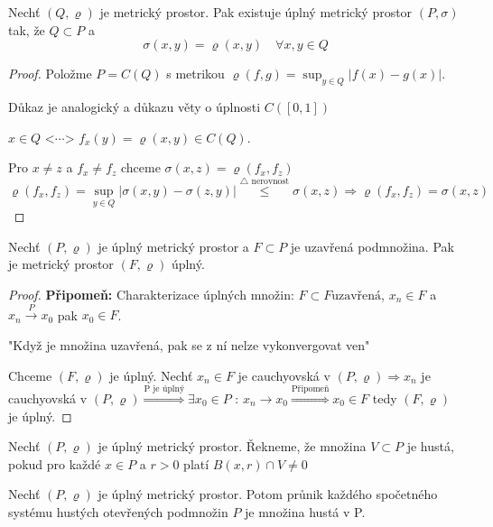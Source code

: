 \begin{vetat}
Nechť $(Q, \varrho)$ je metrický prostor. Pak existuje úplný metrický prostor $(P, \sigma)$ tak, že $Q \subset P$ a 
$$\sigma(x,y) = \varrho(x,y) \quad \forall x,y \in Q$$
\end{vetat}

\begin{proof}
Položme $P = C(Q)$ s metrikou $\varrho (f,g) = \sup_{y \in Q} | f(x)-g(x) |$. 

\begin{poznamka} 
Důkaz je analogický a důkazu věty o úplnosti $C([0,1])$
\end{poznamka}

$x \in Q \textrm{ <$\cdots$> } f_x(y) = \varrho(x,y) \in C(Q)$. 

Pro $x \neq z$ a $f_x \neq f_z$ chceme $\sigma (x,z) = \varrho (f_x, f_z)$
$$\varrho (f_x, f_z) = \sup_{y \in Q} | \sigma (x,y) - \sigma (z,y) | \overset{\textrm{$\triangle$ nerovnost}}{\leq} \sigma (x,z) \Rightarrow \varrho (f_x, f_z) = \sigma(x,z)$$ 
\end{proof}


\begin{vetal}
Nechť $(P, \varrho)$ je úplný metrický prostor a $F \subset P$ je uzavřená podmnožina. Pak je metrický prostor $(F, \varrho)$ úplný.
\end{vetal}

\begin{proof}
\textbf{Připomeň: } Charakterizace úplných množin: $F \subset F \textrm{uzavřená}$, $x_n \in F$ a $x_n \overset{P}{\to} x_0$ pak $x_0 \in F$. 

"Když je množina uzavřená, pak se z ní nelze vykonvergovat ven"

Chceme $(F, \varrho)$ je úplný. Nechť $x_n \in F$ je cauchyovská v $(P, \varrho)\Rightarrow x_n$ je cauchyovská v $(P, \varrho) \overset{\textrm{P je úplný}}{\Rightarrow} \exists x_0 \in P \textrm{ : } x_n \to x_0 \overset{\textrm{Připomeň}}{\Rightarrow} x_0 \in F$ tedy $(F, \varrho)$ je úplný.
\end{proof}

\begin{definice}
Nechť $(P, \varrho)$ je úplný metrický prostor. Řekneme, že množina $V \subset P$ je hustá, pokud pro každé $x \in P$ a $r > 0$ platí $B(x,r) \cap V \neq 0$
\end{definice}

\begin{vetat}[Baire]
\label{Baire}
Nechť $(P, \varrho)$ je úplný metrický prostor. Potom průnik každého spočetného systému hustých otevřených podmnožin $P$ je množina hustá v P.
\end{vetat}

